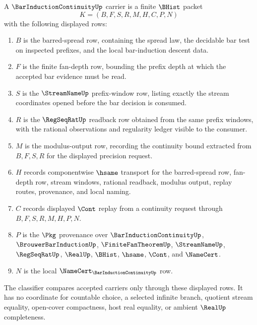 \begin{definition}
\label{def:bar-induction-continuity-carrier}
A $\BarInductionContinuityUp$ carrier is a finite $\BHist$ packet
$$
K=(B,F,S,R,M,H,C,P,N)
$$
with the following displayed rows:
\begin{enumerate}
\item $B$ is the barred-spread row, containing the spread law, the decidable bar test on inspected prefixes, and the local bar-induction descent data.
\item $F$ is the finite fan-depth row, bounding the prefix depth at which the accepted bar evidence must be read.
\item $S$ is the $\StreamNameUp$ prefix-window row, listing exactly the stream coordinates opened before the bar decision is consumed.
\item $R$ is the $\RegSeqRatUp$ readback row obtained from the same prefix windows, with the rational observations and regularity ledger visible to the consumer.
\item $M$ is the modulus-output row, recording the continuity bound extracted from $B,F,S,R$ for the displayed precision request.
\item $H$ records componentwise $\hsame$ transport for the barred-spread row, fan-depth row, stream windows, rational readback, modulus output, replay routes, provenance, and local naming.
\item $C$ records displayed $\Cont$ replay from a continuity request through $B,F,S,R,M,H,P,N$.
\item $P$ is the $\Pkg$ provenance over $\BarInductionContinuityUp$, $\BrouwerBarInductionUp$, $\FiniteFanTheoremUp$, $\StreamNameUp$, $\RegSeqRatUp$, $\RealUp$, $\BHist$, $\hsame$, $\Cont$, and $\NameCert$.
\item $N$ is the local $\NameCert_{\BarInductionContinuityUp}$ row.
\end{enumerate}
The classifier compares accepted carriers only through these displayed rows. It has no coordinate for countable choice, a selected infinite branch, quotient stream equality, open-cover compactness, host real equality, or ambient $\RealUp$ completeness.
\end{definition}

